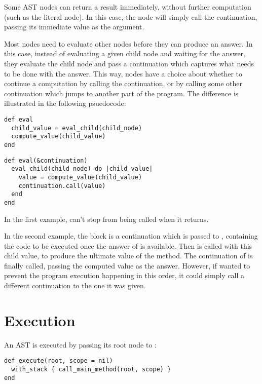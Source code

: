 Some AST nodes can return a result immediately, without further computation (such as the literal  node). In this case, the node will simply call the continuation, passing its immediate value as the argument.

Most nodes need to evaluate other nodes before they can produce an answer. In this case, instead of evaluating a given child node and waiting for the answer, they evaluate the child node and pass a continuation which captures what needs to be done with the answer. This way, nodes have a choice about whether to continue a computation by calling the continuation, or by calling some other continuation which jumps to another part of the program. The difference is illustrated in the following psuedocode:

\begin{lstlisting}[title={\textbf{Without CPS}}]
def eval
  child_value = eval_child(child_node)
  compute_value(child_value)
end
\end{lstlisting}

\begin{lstlisting}[title={\textbf{With CPS}}]
def eval(&continuation)
  eval_child(child_node) do |child_value|
    value = compute_value(child_value)
    continuation.call(value)
  end
end
\end{lstlisting}

In the first example,  can't stop  from being called when it returns.

In the second example, the  block is a continuation which is passed to , containing the code to be executed once the answer of  is available. Then  is called with this child value, to produce the ultimate value of the  method. The continuation of  is finally called, passing the computed value as the answer. However, if  wanted to prevent the program execution happening in this order, it could simply call a different continuation to the one it was given.

\section{Execution}

An AST is executed by passing its root node to :

\begin{lstlisting}
def execute(root, scope = nil)
  with_stack { call_main_method(root, scope) }
end
\end{lstlisting}

